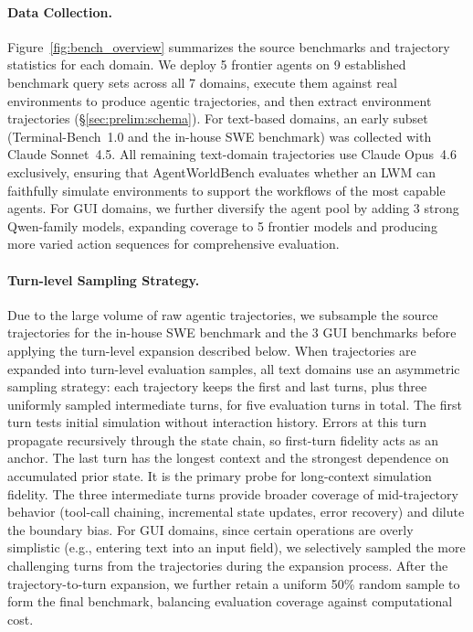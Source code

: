 \documentclass{llmxive}
\providecommand{\bench}{AgentWorldBench\xspace}
\begin{document}
\paragraph{Data Collection.}
Figure~\ref{fig:bench_overview} summarizes the source benchmarks and trajectory statistics for each domain.
We deploy 5 frontier agents on 9 established benchmark query sets across all 7 domains, execute them against real environments to produce agentic trajectories, and then extract environment trajectories (\S\ref{sec:prelim:schema}).
For text-based domains, an early subset (Terminal-Bench~1.0 and the in-house SWE benchmark) was collected with Claude Sonnet~4.5.
All remaining text-domain trajectories use Claude Opus~4.6 exclusively, ensuring that \bench evaluates whether an LWM can faithfully simulate environments to support the workflows of the most capable agents.
For GUI domains, we further diversify the agent pool by adding 3 strong Qwen-family models, expanding coverage to 5 frontier models and producing more varied action sequences for comprehensive evaluation.


\paragraph{Turn-level Sampling Strategy.}
\label{sec:bench:construction:turn_sampling}

Due to the large volume of raw agentic trajectories, we subsample the source trajectories for the in-house SWE benchmark and the 3 GUI benchmarks before applying the turn-level expansion described below.
When trajectories are expanded into turn-level evaluation samples, all text domains use an asymmetric sampling strategy: each trajectory keeps the first and last turns, plus three uniformly sampled intermediate turns, for five evaluation turns in total.
The first turn tests initial simulation without interaction history.
Errors at this turn propagate recursively through the state chain, so first-turn fidelity acts as an anchor.
The last turn has the longest context and the strongest dependence on accumulated prior state. It is the primary probe for long-context simulation fidelity.
The three intermediate turns provide broader coverage of mid-trajectory behavior (tool-call chaining, incremental state updates, error recovery) and dilute the boundary bias.
For GUI domains, since certain operations are overly simplistic (e.g., entering text into an input field), we selectively sampled the more challenging turns from the trajectories during the expansion process.
After the trajectory-to-turn expansion, we further retain a uniform 50\% random sample to form the final benchmark, balancing evaluation coverage against computational cost.
\end{document}
